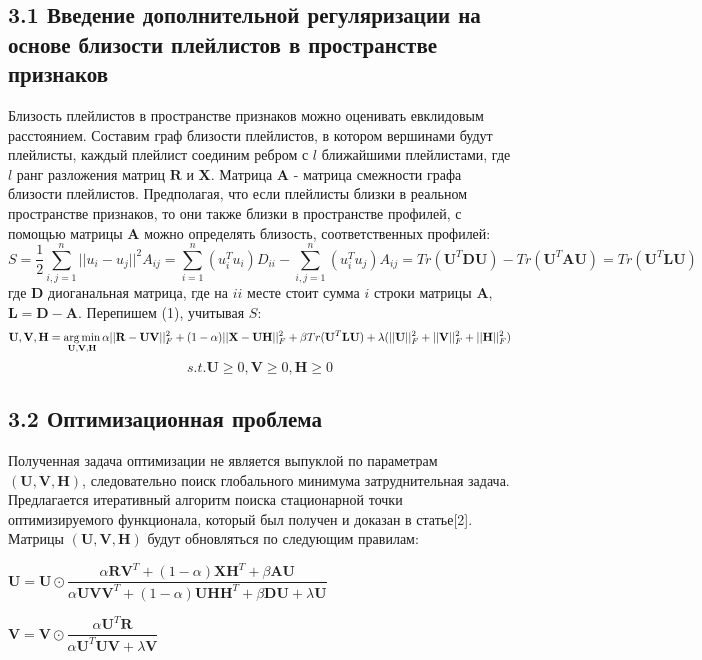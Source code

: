 \documentclass[12pt,twoside]{article}
\begin{document}
\subsection{3.1 Введение дополнительной регуляризации на основе близости плейлистов в пространстве признаков}

{Близость плейлистов в пространстве признаков можно оценивать евклидовым расстоянием. Составим граф близости плейлистов, в котором вершинами будут плейлисты, каждый плейлист соединим ребром с $l$ ближайшими плейлистами, где $l$ ранг разложения матриц $\mathbf{R}$ и $\mathbf{X}$. Матрица $\mathbf{A}$ - матрица смежности графа близости плейлистов. Предполагая, что если плейлисты близки в реальном пространстве признаков, то они также близки в пространстве профилей, с помощью матрицы $\mathbf{A}$ можно определять близость, соответственных профилей:
$$S = \frac{1}{2}\sum_{i, j = 1}^n||u_i - u_j||^2A_{ij} = \sum_{i = 1}^n (u_i^Tu_i)D_{ii} - \sum_{i,j = 1}^n (u_i^Tu_j)A_{ij} = {Tr}(\mathbf{U}^T\mathbf{DU}) -  {Tr}(\mathbf{U}^T\mathbf{AU}) = {Tr}(\mathbf{U}^T\mathbf{LU})$$
где $\mathbf{D}$ диоганальная матрица, где на $ii$ месте стоит сумма $i$ строки матрицы $\mathbf{A}$, $\mathbf{L} = \mathbf{D} - \mathbf{A}$. Перепишем (1), учитывая $S$:
$$\mathbf{U, V, H} = \argmin_{\mathbf{U, V, H}}\alpha||\mathbf{R} - \mathbf{UV}||_F^2 +(1 - \alpha) ||\mathbf{X} - \mathbf{UH}||_F^2 +  \beta{Tr}(\mathbf{U}^T\mathbf{LU}) +  \lambda(||\mathbf{U}||_F^2 + ||\mathbf{V}||_F^2 + ||\mathbf{H}||_F^2)$$
$$ s.t. \mathbf{U} \geq 0,  \mathbf{V} \geq 0,  \mathbf{H} \geq 0$$}

\subsection{3.2 Оптимизационная проблема}

Полученная задача оптимизации не является выпуклой по параметрам $(\mathbf{U, V, H})$, следовательно поиск глобального минимума затруднительная задача. Предлагается итеративный алгоритм поиска стационарной точки оптимизируемого функционала, который был получен и доказан в статье[2]. Матрицы $(\mathbf{U, V, H})$ будут обновляться по следующим правилам:

$\mathbf{U} = \mathbf{U} \odot \dfrac{\alpha\mathbf{R}\mathbf{V}^T + (1 -\alpha)\mathbf{X}\mathbf{H}^T + \beta\mathbf{AU}}{\alpha\mathbf{UV}\mathbf{V}^T + (1 - \alpha)\mathbf{UH}\mathbf{H}^T + \beta\mathbf{DU} + \lambda\mathbf{U}}$

$\mathbf{V} = \mathbf{V} \odot \dfrac{\alpha\mathbf{U}^T\mathbf{R}}{\alpha\mathbf{U}^T\mathbf{UV} + \lambda\mathbf{V}}$
\end{document}
